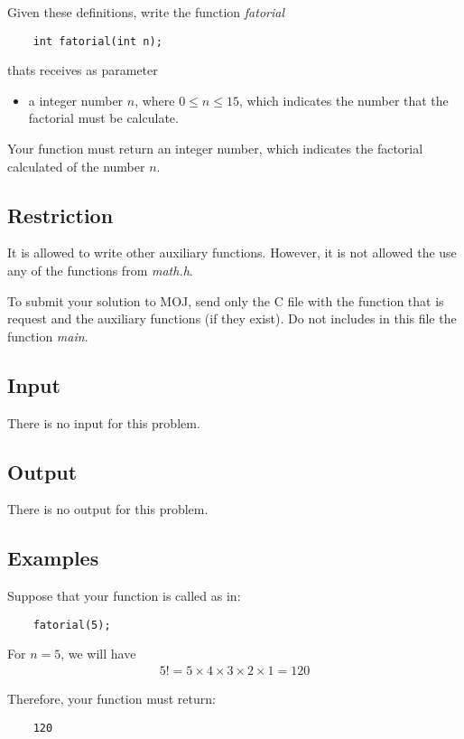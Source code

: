 Given these definitions, write the function \emph{fatorial}

\begin{lstlisting}
	int fatorial(int n);
\end{lstlisting}

thats receives as parameter
\begin{itemize}
	\item a integer number $n$, where $0 \leq n \leq 15$, which indicates the number that the factorial must be calculate.
\end{itemize}

Your function must return an integer number, which indicates the factorial calculated of the number $n$.

\subsection*{Restriction}

It is allowed to write other auxiliary functions. However, it is not allowed the use any of the functions from \textit{math.h}.

To submit your solution to MOJ, send only the C file with the function that is request and the auxiliary functions (if they exist). Do not includes in this file the function \textit{main}.


\subsection*{Input}

There is no input for this problem.


\subsection*{Output}
There is no output for this problem.

\subsection*{Examples}


Suppose that your function is called as in:
\begin{lstlisting}
	fatorial(5);
\end{lstlisting}

For $n = 5$, we will have
\begin{equation*}
	\begin{matrix}
		5! = 5 \times 4 \times 3 \times 2 \times 1 = 120
	\end{matrix}
\end{equation*}

Therefore, your function must return:
\begin{lstlisting}
	120
\end{lstlisting}

